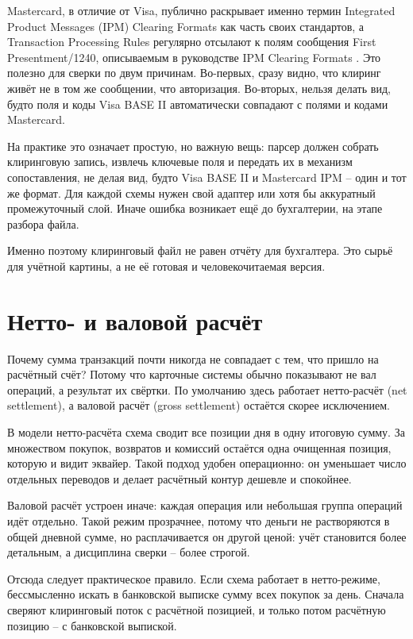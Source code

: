 Mastercard, в отличие от Visa, публично раскрывает именно термин
Integrated Product Messages (IPM) Clearing Formats как часть своих
стандартов, а Transaction Processing Rules регулярно отсылают к полям
сообщения First Presentment/1240, описываемым в руководстве
IPM Clearing Formats
\cite{mc-pfmi-disclosure}\cite{mc-tpr}. Это полезно для сверки
по двум причинам. Во-первых, сразу видно, что клиринг живёт не в том же
сообщении, что авторизация. Во-вторых, нельзя делать вид, будто поля и
коды Visa BASE II автоматически совпадают с полями и кодами
Mastercard.

На практике это означает простую, но важную вещь: парсер должен
собрать клиринговую запись, извлечь ключевые поля и передать их в
механизм сопоставления, не делая вид, будто Visa BASE II и Mastercard
IPM -- один и тот же формат. Для каждой схемы нужен свой адаптер или
хотя бы аккуратный промежуточный слой. Иначе ошибка возникает ещё до
бухгалтерии, на этапе разбора файла.

Именно поэтому клиринговый файл не равен отчёту для бухгалтера. Это
сырьё для учётной картины, а не её готовая и человекочитаемая версия.

\section{Нетто- и валовой расчёт}
\label{sec:recon-net-vs-gross}

Почему сумма транзакций почти никогда не совпадает с тем, что пришло на
расчётный счёт? Потому что карточные системы обычно показывают не вал
операций, а результат их свёртки. По умолчанию здесь работает
нетто-расчёт (net settlement), а валовой расчёт (gross settlement)
остаётся скорее исключением.

В модели нетто-расчёта схема сводит все позиции дня в одну итоговую
сумму. За множеством покупок, возвратов и комиссий остаётся одна
очищенная позиция, которую и видит эквайер. Такой подход удобен
операционно: он уменьшает число отдельных переводов и делает расчётный
контур дешевле и спокойнее.

Валовой расчёт устроен иначе: каждая операция или небольшая группа
операций идёт отдельно. Такой режим прозрачнее, потому что деньги не
растворяются в общей дневной сумме, но расплачивается он другой ценой:
учёт становится более детальным, а дисциплина сверки -- более строгой.

Отсюда следует практическое правило. Если схема работает в нетто-режиме,
бессмысленно искать в банковской выписке сумму всех покупок за день.
Сначала сверяют клиринговый поток с расчётной позицией, и только потом
расчётную позицию -- с банковской выпиской.

